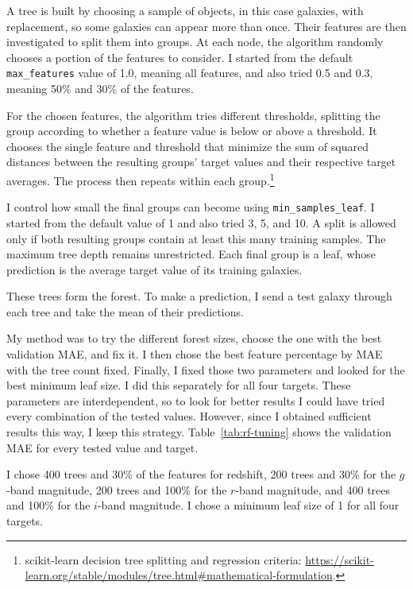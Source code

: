 \documentclass[12pt,a4paper]{article}
\begin{document}
A tree is built by choosing a sample of objects, in this case galaxies, with replacement, so some galaxies can appear more than once. Their features are then investigated to split them into groups. At each node, the algorithm randomly chooses a portion of the features to consider. I started from the default \texttt{max\_features} value of 1.0, meaning all features, and also tried 0.5 and 0.3, meaning 50\% and 30\% of the features.

For the chosen features, the algorithm tries different thresholds, splitting the group according to whether a feature value is below or above a threshold. It chooses the single feature and threshold that minimize the sum of squared distances between the resulting groups' target values and their respective target averages. The process then repeats within each group.\footnote{\raggedright scikit-learn decision tree splitting and regression criteria: \url{https://scikit-learn.org/stable/modules/tree.html\#mathematical-formulation}.}

I control how small the final groups can become using \texttt{min\_samples\_leaf}. I started from the default value of 1 and also tried 3, 5, and 10. A split is allowed only if both resulting groups contain at least this many training samples. The maximum tree depth remains unrestricted. Each final group is a leaf, whose prediction is the average target value of its training galaxies.

These trees form the forest. To make a prediction, I send a test galaxy through each tree and take the mean of their predictions.

My method was to try the different forest sizes, choose the one with the best validation MAE, and fix it. I then chose the best feature percentage by MAE with the tree count fixed. Finally, I fixed those two parameters and looked for the best minimum leaf size. I did this separately for all four targets. These parameters are interdependent, so to look for better results I could have tried every combination of the tested values. However, since I obtained sufficient results this way, I keep this strategy. Table~\ref{tab:rf-tuning} shows the validation MAE for every tested value and target.

I chose 400 trees and 30\% of the features for redshift, 200 trees and 30\% for the $g$-band magnitude, 200 trees and 100\% for the $r$-band magnitude, and 400 trees and 100\% for the $i$-band magnitude. I chose a minimum leaf size of 1 for all four targets.
\end{document}
